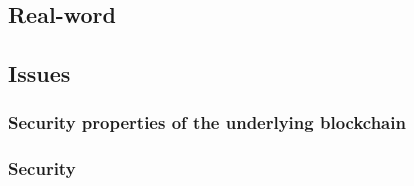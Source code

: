 \subsection{Real-word}

\subsection{Issues}

\subsubsection{Security properties of the underlying blockchain}

\subsubsection{Security}



